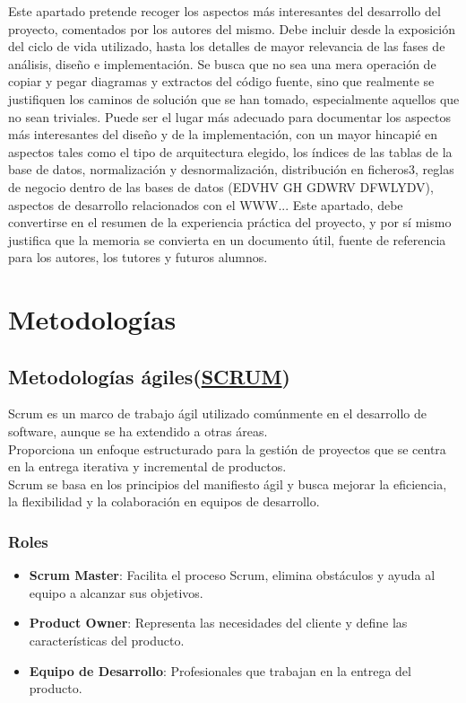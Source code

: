 
Este apartado pretende recoger los aspectos más interesantes del desarrollo del proyecto, comentados por los autores del mismo.
Debe incluir desde la exposición del ciclo de vida utilizado, 
hasta los detalles de mayor relevancia de las fases de análisis, diseño e implementación.
Se busca que no sea una mera operación de copiar y pegar diagramas y extractos del código fuente, 
sino que realmente se justifiquen los caminos de solución que se han tomado, 
especialmente aquellos que no sean triviales.
Puede ser el lugar más adecuado para documentar los aspectos más interesantes del diseño y 
de la implementación, con un mayor hincapié en aspectos tales como el tipo de arquitectura elegido, 
los índices de las tablas de la base de datos, normalización y desnormalización, 
distribución en ficheros3, reglas de negocio dentro de las bases de datos (EDVHV GH GDWRV DFWLYDV), 
aspectos de desarrollo relacionados con el WWW...
Este apartado, debe convertirse en el resumen de la experiencia práctica del proyecto, y 
por sí mismo justifica que la memoria se convierta en un documento útil, 
fuente de referencia para los autores, los tutores y futuros alumnos.

\section{Metodologías}

\subsection{Metodologías ágiles(\href{https://www.scrum.org/}{SCRUM})}
Scrum es un marco de trabajo ágil utilizado comúnmente en el desarrollo de software, 
aunque se ha extendido a otras áreas. \\
Proporciona un enfoque estructurado para la gestión de proyectos que se centra en la entrega 
iterativa y incremental de productos. \\
Scrum se basa en los principios del manifiesto ágil y busca mejorar la eficiencia, 
la flexibilidad y la colaboración en equipos de desarrollo.

\subsubsection{Roles}

\begin{itemize}
   \item \textbf{Scrum Master}: Facilita el proceso Scrum, elimina obstáculos y ayuda al equipo a alcanzar sus objetivos.
   \item \textbf{Product Owner}: Representa las necesidades del cliente y define las características del producto.
   \item \textbf{Equipo de Desarrollo}: Profesionales que trabajan en la entrega del producto.
\end{itemize}

